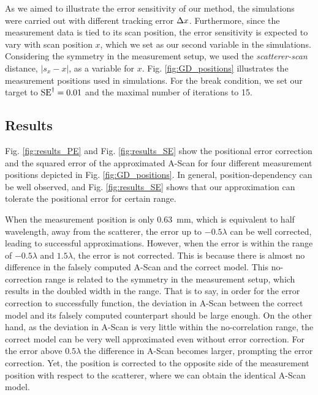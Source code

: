As we aimed to illustrate the error sensitivity of our method, the simulations were carried out with different tracking error $\Delta x$. Furthermore, since the measurement data is tied to its scan position, the error sensitivity is expected to vary with scan position $x$, which we set as our second variable in the simulations. Considering the symmetry in the measurement setup, we used the \textit{scatterer-scan} distance, $| s_{x} - x|$, as a variable for $x$. Fig. \ref{fig:GD_positions} illustrates the measurement positions used in simulations. For the break condition, we set our target to $\operatorname{SE}^{\dagger} = 0.01$ and the maximal number of iterations to 15. 


\subsection{Results} 
Fig. \ref{fig:results_PE} and Fig. \ref{fig:results_SE} show the positional error correction and the squared error of the approximated A-Scan for four different measurement positions depicted in Fig. \ref{fig:GD_positions}. In general, position-dependency can be well observed, and Fig. \ref{fig:results_SE} shows that our approximation can tolerate the positional error for certain range. \par

When the measurement position is only \SI{0.63}{\milli \metre}, which is equivalent to half wavelength, away from the scatterer, the error up to $- 0.5 \lambda$ can be well corrected, leading to successful approximations. However, when the error is within the range of $- 0.5 \lambda$ and $1.5 \lambda$, the error is not corrected. This is because there is almost no difference in the falsely computed A-Scan and the correct model. This no-correction range is related to the symmetry in the measurement setup, which results in the doubled width in the range. That is to say, in order for the error correction to successfully function, the deviation in A-Scan between the correct model and its falsely computed counterpart should be large enough. On the other hand, as the deviation in A-Scan is very little within the no-correlation range, the correct model can be very well approximated even without error correction. For the error above $0.5 \lambda$ the difference in A-Scan becomes larger, prompting the error correction. Yet, the position is corrected to the opposite side of the measurement position with respect to the scatterer, where we can obtain the identical A-Scan model. \par

